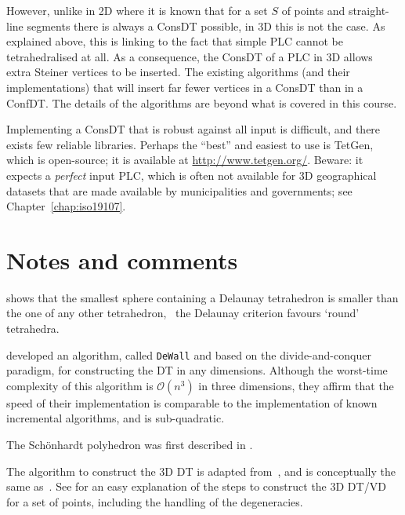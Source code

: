 However, unlike in 2D where it is known that for a set $S$ of points and straight-line segments there is always a ConsDT possible, in 3D this is not the case.
As explained above, this is linking to the fact that simple PLC cannot be tetrahedralised at all.
As a consequence, the ConsDT of a PLC in 3D allows extra Steiner vertices to be inserted.
The existing algorithms (and their implementations) that will insert far fewer vertices in a ConsDT than in a ConfDT\@. 
The details of the algorithms are beyond what is covered in this course.

%

\newpage
\begin{kaobox}[frametitle=\faCog\ How does it work in practice?]
  Implementing a ConsDT that is robust against all input is difficult, and there exists few reliable libraries.
  Perhaps the ``best'' and easiest to use is TetGen, which is open-source; it is available at \url{http://www.tetgen.org/}.
  Beware: it expects a \emph{perfect} input PLC, which is often not available for 3D geographical datasets that are made available by municipalities and governments; see Chapter~\ref{chap:iso19107}.
\end{kaobox}


%
\section{Notes and comments}

\citet{Rajan91} shows that the smallest sphere containing a Delaunay tetrahedron is smaller than the one of any other tetrahedron, \ie\ the Delaunay criterion favours `round' tetrahedra.

\citet{Cignoni98} developed an algorithm, called \texttt{DeWall} and based on the divide-and-conquer paradigm, for constructing the DT in any dimensions. Although the worst-time complexity of this algorithm is $\mathcal{O}(n^3)$ in three dimensions, they affirm that the speed of their implementation is comparable to the implementation of known incremental algorithms, and is sub-quadratic.

The Schönhardt polyhedron was first described in \citet{Schonhardt28}. 

The algorithm to construct the 3D DT is adapted from~\cite{Joe91}, and is conceptually the same as~\cite{Edelsbrunner96}. 
See \citet{Ledoux07} for an easy explanation of the steps to construct the 3D DT/VD for a set of points, including the handling of the degeneracies. 

